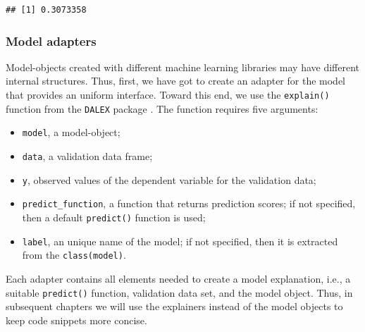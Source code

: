\documentclass[12pt,]{krantz}
\providecommand{\tightlist}{%
  \setlength{\itemsep}{0pt}\setlength{\parskip}{0pt}}
\begin{document}
\begin{verbatim}
## [1] 0.3073358
\end{verbatim}

\hypertarget{ExplainersTitanicRCode}{%
\subsubsection{Model adapters}\label{ExplainersTitanicRCode}}

Model-objects created with different machine learning libraries may have different internal structures. Thus, first, we have got to create an adapter for the model that provides an uniform interface. Toward this end, we use the \texttt{explain()} function from the \texttt{DALEX} package \citep{DALEX}. The function requires five arguments:

\begin{itemize}
\tightlist
\item
  \texttt{model}, a model-object;
\item
  \texttt{data}, a validation data frame;
\item
  \texttt{y}, observed values of the dependent variable for the validation data;
\item
  \texttt{predict\_function}, a function that returns prediction scores; if not specified, then a default \texttt{predict()} function is used;
\item
  \texttt{label}, an unique name of the model; if not specified, then it is extracted from the \texttt{class(model)}.
\end{itemize}

Each adapter contains all elements needed to create a model explanation, i.e., a suitable \texttt{predict()} function, validation data set, and the model object. Thus, in subsequent chapters we will use the explainers instead of the model objects to keep code snippets more concise.
\end{document}
